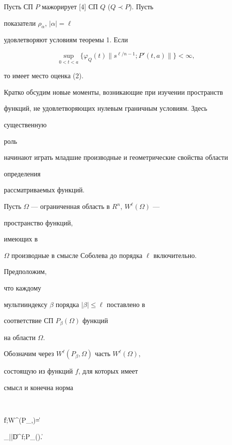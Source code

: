  


\begin{cor} Пусть СП $P$ мажорирует [4] СП $Q$ ($Q\prec P$). Пусть 


показатели $\rho_\alpha$, $|\alpha|=\ell$ 


удовлетворяют условиям теоремы 1. Если 


$$


\sup_{0<t<a}\{\varphi_Q(t)\|s^{\ell/n-1};P'(t,a)\|\}<\infty, 


$$


то имеет место оценка (2). 


\end{cor} 


 


Кратко обсудим новые моменты, возникающие при изучении пространств 


функций, не удовлетворяющих нулевым граничным условиям. Здесь 


существенную  


роль 


начинают играть младшие производные и геометрические свойства области 


определения 


рассматриваемых функций. 


 


Пусть $\Omega$ --- ограниченная область в $R^n$, $W^\ell(\Omega)$ --- 


пространство функций, 


имеющих в 


$\Omega$ производные в смысле Соболева до порядка $\ell$ включительно. 


Предположим, 


что каждому 


мультииндексу $\beta$ порядка $|\beta|\le\ell$ поставлено в 


соответствие СП $P_\beta(\Omega)$ функций 


на области $\Omega$. 


Обозначим через $W^\ell(P_\beta,\Omega)$ часть $W^\ell(\Omega)$, 


состоящую из функций $f$, для которых имеет 


смысл и конечна норма 


$$ 


\|f;W^\ell(P_\beta,\Omega)\|= 


\sum_{|\beta|\le\ell}\|D^\beta f;P_\beta(\Omega)\|. 


